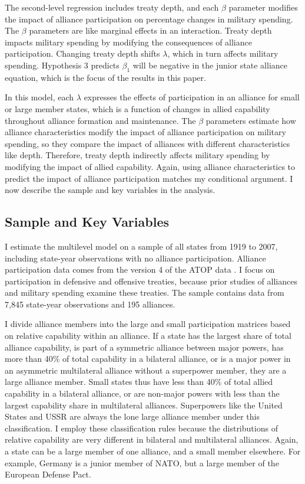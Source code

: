 \documentclass[12pt]{article}
\begin{document}
The second-level regression includes treaty depth, and each $\beta$ parameter modifies the impact of alliance participation on percentage changes in military spending. 
The $\beta$ parameters are like marginal effects in an interaction. 
Treaty depth impacts military spending by modifying the consequences of alliance participation. 
Changing treaty depth shifts $\lambda$, which in turn affects military spending.
Hypothesis 3 predicts $\beta_1$ will be negative in the junior state alliance equation, which is the focus of the results in this paper. 


In this model, each $\lambda$ expresses the effects of participation in an alliance for small or large member states, which is a function of changes in allied capability throughout alliance formation and maintenance.
The $\beta$ parameters estimate how alliance characteristics modify the impact of alliance participation on military spending, so they compare the impact of alliances with different characteristics like depth.
Therefore, treaty depth indirectly affects military spending by modifying the impact of allied capability.  
Again, using alliance characteristics to predict the impact of alliance participation matches my conditional argument. 
I now describe the sample and key variables in the analysis.  



\subsection{Sample and Key Variables} 

I estimate the multilevel model on a sample of all states from 1919 to 2007, including state-year observations with no alliance participation. 
Alliance participation data comes from the version 4 of the ATOP data \citep{Leedsetal2002}.  
I focus on participation in defensive and offensive treaties, because prior studies of alliances and military spending examine these treaties. 
The sample contains data from 7,845 state-year observations and 195 alliances. 


I divide alliance members into the large and small participation matrices based on relative capability within an alliance. 
If a state has the largest share of total alliance capability, is part of a symmetric alliance between major powers, has more than 40\% of total capability in a bilateral alliance, or is a major power in an asymmetric multilateral alliance without a superpower member, they are a large alliance member. 
Small states thus have less than 40\% of total allied capability in a bilateral alliance, or are non-major powers with less than the largest capability share in multilateral alliances. 
Superpowers like the United States and USSR are always the lone large alliance member under this classification. 
I employ these classification rules because the distributions of relative capability are very different in bilateral and multilateral alliances. 
Again, a state can be a large member of one alliance, and a small member elsewhere. 
For example, Germany is a junior member of NATO, but a large member of the European Defense Pact.
\end{document}
